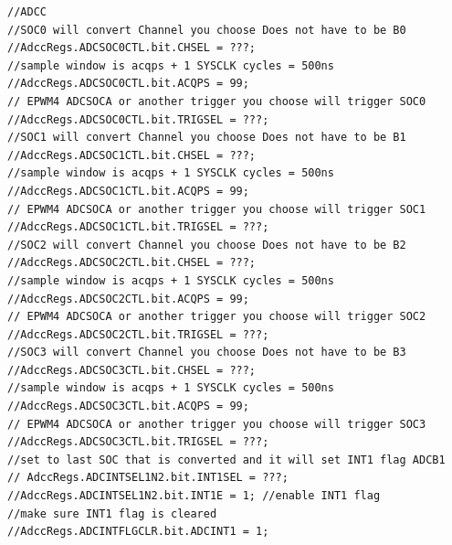 \documentclass[11pt]{article}
\begin{document}
\begin{enumerate}
\begin{verbatim}
//ADCC
//SOC0 will convert Channel you choose Does not have to be B0
//AdccRegs.ADCSOC0CTL.bit.CHSEL = ???;
//sample window is acqps + 1 SYSCLK cycles = 500ns
//AdccRegs.ADCSOC0CTL.bit.ACQPS = 99;
// EPWM4 ADCSOCA or another trigger you choose will trigger SOC0
//AdccRegs.ADCSOC0CTL.bit.TRIGSEL = ???;
//SOC1 will convert Channel you choose Does not have to be B1
//AdccRegs.ADCSOC1CTL.bit.CHSEL = ???;
//sample window is acqps + 1 SYSCLK cycles = 500ns
//AdccRegs.ADCSOC1CTL.bit.ACQPS = 99;
// EPWM4 ADCSOCA or another trigger you choose will trigger SOC1
//AdccRegs.ADCSOC1CTL.bit.TRIGSEL = ???;
//SOC2 will convert Channel you choose Does not have to be B2
//AdccRegs.ADCSOC2CTL.bit.CHSEL = ???;
//sample window is acqps + 1 SYSCLK cycles = 500ns
//AdccRegs.ADCSOC2CTL.bit.ACQPS = 99;
// EPWM4 ADCSOCA or another trigger you choose will trigger SOC2
//AdccRegs.ADCSOC2CTL.bit.TRIGSEL = ???;
//SOC3 will convert Channel you choose Does not have to be B3
//AdccRegs.ADCSOC3CTL.bit.CHSEL = ???;
//sample window is acqps + 1 SYSCLK cycles = 500ns
//AdccRegs.ADCSOC3CTL.bit.ACQPS = 99;
// EPWM4 ADCSOCA or another trigger you choose will trigger SOC3
//AdccRegs.ADCSOC3CTL.bit.TRIGSEL = ???;
//set to last SOC that is converted and it will set INT1 flag ADCB1
// AdccRegs.ADCINTSEL1N2.bit.INT1SEL = ???;
//AdccRegs.ADCINTSEL1N2.bit.INT1E = 1; //enable INT1 flag
//make sure INT1 flag is cleared
//AdccRegs.ADCINTFLGCLR.bit.ADCINT1 = 1;


\end{verbatim}
\end{enumerate}
\end{document}
